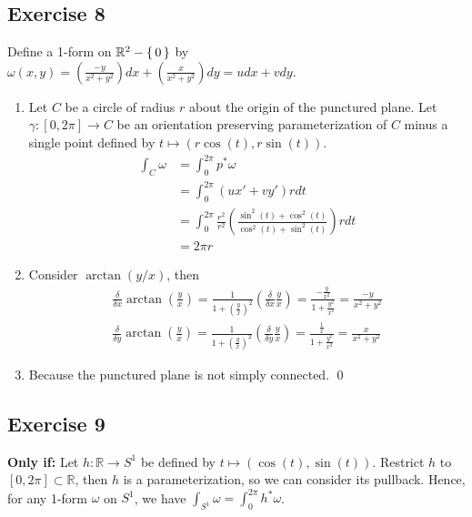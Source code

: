 \documentclass{article}
\newcommand{\R}{\mathbb{R}}
\begin{document}
  \subsection*{Exercise 8}
    Define a 1-form on $\R^2-\set{0}$ by $\omega(x,y)=\left(\frac{-y}{x^2+y^2}
    \right)dx+\left(\frac{x}{x^2+y^2}\right)dy=udx+vdy$.
    \begin{enumerate}[label=\textbf{(\alph*)}]
      \item{
        Let $C$ be a circle of radius $r$ about the origin of the punctured
        plane. Let $\gamma\colon[0,2\pi]\to C$ be an orientation preserving
        parameterization of $C$ minus a single point defined by $t\mapsto(
        r\cos(t),r\sin(t))$.
        \begin{align*}
          \int_C\omega
            &=\int_0^{2\pi}p^*\omega\\
            &=\int_0^{2\pi}(ux'+vy')rdt\\
            &=\int_0^{2\pi}\frac{r^2}{r^2}\left(\frac{\sin^2(t)+\cos^2(t)}
              {\cos^2(t)+\sin^2(t)}\right)rdt\\
            &= 2\pi r
        \end{align*}
      }
      \item{
        Consider $\arctan(y/x)$, then
        \begin{align*}
          \frac{\delta}{\delta x}\arctan\left(\frac{y}{x}\right)
            =\frac{1}{1+\left(\frac{y}{x}\right)^2}\left(\frac{\delta}{\delta x}
            \frac{y}{x}\right)
            =\frac{-\frac{y}{x^2}}{1+\frac{y^2}{x^2}}
            =\frac{-y}{x^2+y^2}\\
          \frac{\delta}{\delta y}\arctan\left(\frac{y}{x}\right)
          =\frac{1}{1+\left(\frac{y}{x}\right)^2}\left(\frac{\delta}{\delta y}
          \frac{y}{x}\right)
          =\frac{\frac{1}{x}}{1+\frac{y^2}{x^2}}
          =\frac{x}{x^2+y^2}
        \end{align*}
      }
      \item{
        Because the punctured plane is not simply connected.
      }
      \qed
    \end{enumerate}

  \subsection*{Exercise 9}
    \textbf{Only if:} Let $h\colon\R\to S^1$ be defined by $t\mapsto(\cos(t),
    \sin(t))$. Restrict $h$ to $[0,2\pi]\subset\R$, then $h$ is a
    parameterization, so we can consider its pullback. Hence, for any 1-form
    $\omega$ on $S^1$, we have $\int_{S^1}\omega=\int_0^{2\pi}h^*\omega$.
\end{document}
